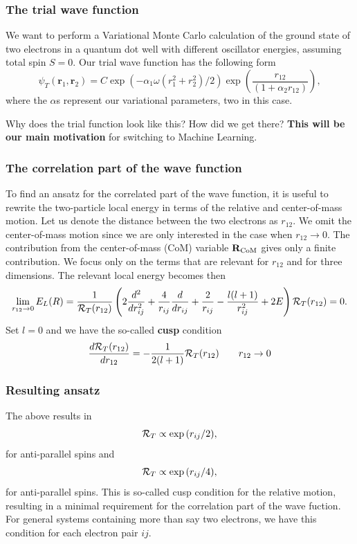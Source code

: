 \documentclass{beamer}
\begin{document}
\begin{frame}
\frametitle{The trial wave function}

\begin{block}{}
We want to perform  a Variational Monte Carlo calculation of the ground state of two electrons in a quantum dot well with different oscillator energies, assuming total spin $S=0$.
Our trial wave function has the following form
\begin{equation}
   \psi_{T}(\bm{r}_1,\bm{r}_2) = 
   C\exp{\left(-\alpha_1\omega(r_1^2+r_2^2)/2\right)}
   \exp{\left(\frac{r_{12}}{(1+\alpha_2 r_{12})}\right)}, 
\label{eq:trial}
\end{equation}
where the $\alpha$s represent our variational parameters, two in this case.

Why does the trial function look like this? How did we get there? \textbf{This will be our main motivation} for switching to
Machine Learning.

\end{block}
\end{frame}

\begin{frame}
\frametitle{The correlation part of the wave function}

To find an ansatz for the correlated part of the wave function, it is useful to rewrite the two-particle
local energy in terms of the relative and center-of-mass motion.
Let us denote the distance between the two electrons as
$r_{12}$. We omit the center-of-mass motion since we are only interested in the case when
$r_{12} \rightarrow 0$. The contribution from the center-of-mass (CoM) variable ${\bf R}_{\mathrm{CoM}}$
gives only a finite contribution.
We focus only on the terms that are relevant for $r_{12}$ and for three dimensions. The relevant local energy becomes then
\[
\lim_{r_{12} \rightarrow 0}E_L(R)=
    \frac{1}{{\cal R}_T(r_{12})}\left(2\frac{d^2}{dr_{ij}^2}+\frac{4}{r_{ij}}\frac{d}{dr_{ij}}+
\frac{2}{r_{ij}}-\frac{l(l+1)}{r_{ij}^2}+2E
\right){\cal R}_T(r_{12}) = 0.
\]
Set $l=0$ and we have the so-called \textbf{cusp} condition
\[
\frac{d {\cal R}_T(r_{12})}{dr_{12}} = -\frac{1}{2(l+1)}
{\cal R}_T(r_{12})\qquad r_{12}\to 0
\]
\end{frame}

\begin{frame}
\frametitle{Resulting ansatz}

The above  results in
\[
{\cal R}_T  \propto \exp{(r_{ij}/2)}, 
\]
for anti-parallel spins and 
\[
{\cal R}_T  \propto \exp{(r_{ij}/4)}, 
\]
for anti-parallel spins. 
This is so-called cusp condition for the relative motion, resulting in a minimal requirement
for the correlation part of the wave fuction.
For general systems containing more than say two electrons, we have this
condition for each electron pair $ij$.
\end{frame}
\end{document}

